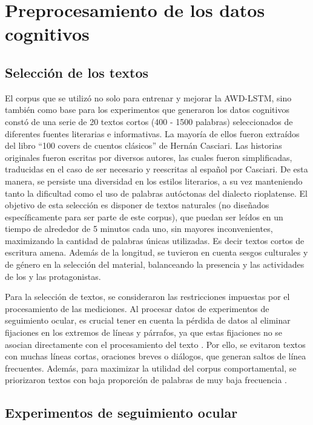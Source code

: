 \chapter{Preprocesamiento de los datos cognitivos}

\label{chap:preprocesamiento}

\section{Selección de los textos}

El corpus que se utilizó no solo para entrenar y mejorar la AWD-LSTM, sino también como base para los experimentos que generaron los datos cognitivos constó de una serie de 20 textos cortos (400 - 1500 palabras) seleccionados de diferentes fuentes literarias e informativas. La mayoría de ellos fueron extraídos del libro “100 covers de cuentos clásicos” de Hernán Casciari. Las historias originales fueron escritas por diversos autores, las cuales fueron simplificadas, traducidas en el caso de ser necesario y reescritas al español por Casciari. De esta manera, se persiste una diversidad en los estilos literarios, a su vez manteniendo tanto la dificultad como el uso de palabras autóctonas del dialecto rioplatense. El objetivo de esta selección es disponer de textos naturales (no diseñados específicamente para ser parte de este corpus), que puedan ser leídos en un tiempo de alrededor de 5 minutos cada uno, sin mayores inconvenientes, maximizando la cantidad de palabras únicas utilizadas. Es decir textos cortos de escritura amena. Además de la longitud, se tuvieron en cuenta sesgos culturales y de género en la selección del material, balanceando la presencia y las actividades de los y las protagonistas.

Para la selección de textos, se consideraron las restricciones impuestas por el procesamiento de las mediciones. Al procesar datos de experimentos de seguimiento ocular, es crucial tener en cuenta la pérdida de datos al eliminar fijaciones en los extremos de líneas y párrafos, ya que estas fijaciones no se asocian directamente con el procesamiento del texto \parencite{Rayner1998}. Por ello, se evitaron textos con muchas líneas cortas, oraciones breves o diálogos, que generan saltos de línea frecuentes. Además, para maximizar la utilidad del corpus comportamental, se priorizaron textos con baja proporción de palabras de muy baja frecuencia \parencite{Inhoff1984}.

\section{Experimentos de seguimiento ocular}

